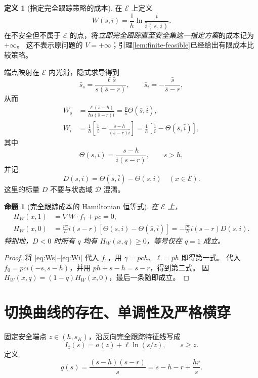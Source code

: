 \documentclass[11pt,a4paper,UTF8]{ctexart}
\newtheorem{proposition}[theorem]{命题}
\theoremstyle{definition}
\newtheorem{definition}[theorem]{定义}
\newcommand{\Dcal}{\mathcal D}
\begin{document}
\begin{definition}[指定完全跟踪策略的成本]
\label{def:W}
在 $\mathcal E$ 上定义
\begin{equation}
W(s,i)=\frac1h\ln\frac{i}{\bar i(s,i)}.
\label{eq:W}
\end{equation}
在不安全但不属于 $\mathcal E$ 的点，将\emph{立即完全跟踪直至安全集这一指定方案}的成本记为 $+\infty$。
这不表示原问题的 $V=+\infty$；引理\ref{lem:finite-feasible}已经给出有限成本比较策略。
\end{definition}
端点映射在 $\mathcal E$ 内光滑，隐式求导得到
\begin{equation}
\bar s_s=\frac{\ell\bar s}{s(\bar s-r)},\qquad
\bar s_i=-\frac{\bar s}{\bar s-r},
\label{eq:endpoint-derivatives}
\end{equation}
从而
\begin{align}
W_s&=\frac{\ell(\bar s-h)}{hs(\bar s-r)\bar i}
=\frac p s\Theta(\bar s,\bar i),\label{eq:Ws}\\
W_i&=\frac1h\left[\frac1i-\frac{\bar s-h}{(\bar s-r)\bar i}\right]
=\frac1h\left[\frac1i-\Theta(\bar s,\bar i)\right],\label{eq:Wi}
\end{align}
其中
\begin{equation}
\Theta(s,i)=\frac{s-h}{i(s-r)},\qquad s>h,
\label{eq:Theta}
\end{equation}
并记
\begin{equation}
D(s,i)=\Theta(\bar s,\bar i)-\Theta(s,i)\quad(x\in\mathcal E).
\label{eq:D-residual}
\end{equation}
这里的标量 $D$ 不要与状态域 $\Dcal$ 混淆。

\begin{proposition}[完全跟踪成本的 Hamiltonian 恒等式]
\label{prop:W-HJB}
在 $\mathcal E$ 上，
\begin{align}
H_W(x,1)&=\nabla W\cdot f_1+pc=0,\label{eq:H1-zero}\\
H_W(x,0)&=\frac{pc}{h}i(s-r)[\Theta(s,i)-\Theta(\bar s,\bar i)]
=-\frac{pc}{h}i(s-r)D(s,i).\label{eq:H0-theta}
\end{align}
特别地，$D<0$ 时所有 $q$ 均有 $H_W(x,q)\ge0$，等号仅在 $q=1$ 成立。
\end{proposition}
\begin{proof}
将 \eqref{eq:Ws}--\eqref{eq:Wi} 代入 $f_1$，用 $\gamma=pch$、$\ell=ph$ 即得第一式。
代入 $f_0=pci(-s,s-h)$，并用 $ph+s-h=s-r$，得到第二式。
因 $H_W(x,q)=(1-q)H_W(x,0)$，最后一条随即成立。
\end{proof}

\section{切换曲线的存在、单调性及严格横穿}
\label{sec:switching-curve}
固定安全端点 $z\in(h,s_K)$，沿反向完全跟踪特征线写成
\begin{equation}
I_z(s)=a(z)+\ell\ln(s/z),\qquad s\ge z.
\label{eq:q1-backward}
\end{equation}
定义
\begin{equation}
g(s)=\frac{(s-h)(s-r)}s=s-h-r+\frac{hr}{s}.
\label{eq:g}
\end{equation}
\end{document}
